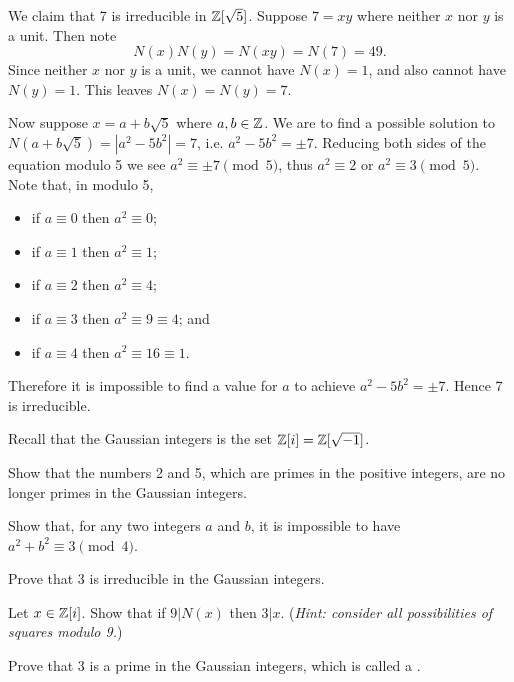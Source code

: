 \begin{example}
    We claim that 7 is irreducible in $\mathbb{Z}[\sqrt{5}]$. Suppose $7 = xy$ where neither $x$ nor $y$ is a unit. Then note
    \[
        N(x)N(y) = N(xy) = N(7) = 49.
    \]
    Since neither $x$ nor $y$ is a unit, we cannot have $N(x) = 1$, and also cannot have $N(y) = 1$. This leaves $N(x) = N(y) = 7$.

    Now suppose $x = a + b\sqrt{5}$ where $a, b \in \mathbb{Z}$. We are to find a possible solution to $N(a+b\sqrt{5}) = |a^2 - 5b^2| = 7$, i.e. $a^2 - 5b^2 = \pm 7$. Reducing both sides of the equation modulo 5 we see $a^2 \equiv \pm7 \pmod5$, thus $a^2 \equiv 2$ or $a^2 \equiv 3 \pmod5$. Note that, in modulo 5,
    \begin{itemize}
        \item if $a \equiv 0$ then $a^2 \equiv 0$;
        \item if $a \equiv 1$ then $a^2 \equiv 1$;
        \item if $a \equiv 2$ then $a^2 \equiv 4$;
        \item if $a \equiv 3$ then $a^2 \equiv 9 \equiv 4$; and
        \item if $a \equiv 4$ then $a^2 \equiv 16 \equiv 1$.
    \end{itemize}
    Therefore it is impossible to find a value for $a$ to achieve $a^2 - 5b^2 = \pm7$. Hence 7 is irreducible.
\end{example}

\begin{exercise}
    Recall that the Gaussian integers is the set $\mathbb{Z}[i] = \mathbb{Z}[\sqrt{-1}]$.
    \begin{partquestions}{\alph*}
        \item Show that the numbers 2 and 5, which are primes in the positive integers, are no longer primes in the Gaussian integers.
        \item \begin{partquestions}{\roman*}
            \item Show that, for any two integers $a$ and $b$, it is impossible to have $a^2 + b^2 \equiv 3 \pmod4$.
            \item Prove that 3 is irreducible in the Gaussian integers.
            \item Let $x \in \mathbb{Z}[i]$. Show that if $9 \vert N(x)$ then $3 \vert x$.\newline
            (\textit{Hint: consider all possibilities of squares modulo 9.})
            \item Prove that 3 is a prime in the Gaussian integers, which is called a .
        \end{partquestions}
    \end{partquestions}
\end{exercise}

